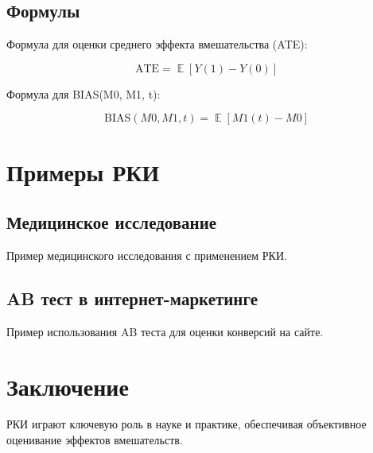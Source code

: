 \documentclass{article}
\DeclareMathOperator{\E}{\mathbb{E}} %
\begin{document}
\subsection{Формулы}

    Формула для оценки среднего эффекта вмешательства (ATE):

    \[
    \text{ATE} = \E[Y(1) - Y(0)]
    \]

    Формула для BIAS(M0, M1, t):

    \[
    \text{BIAS}(M0, M1, t) = \E[M1(t) - M0]
    \]

\section{Примеры РКИ}

\subsection{Медицинское исследование}

Пример медицинского исследования с применением РКИ.

\subsection{AB тест в интернет-маркетинге}

Пример использования AB теста для оценки конверсий на сайте.

\section{Заключение}

РКИ играют ключевую роль в науке и практике, обеспечивая объективное оценивание эффектов вмешательств.
\end{document}
